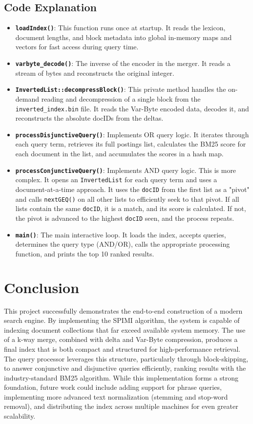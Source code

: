 \documentclass[11pt, a4paper]{report}
\begin{document}
\section{Code Explanation}
\begin{itemize}
    \item \textbf{\texttt{loadIndex()}}: This function runs once at startup. It reads the lexicon, document lengths, and block metadata into global in-memory maps and vectors for fast access during query time.
    \item \textbf{\texttt{varbyte\_decode()}}: The inverse of the encoder in the merger. It reads a stream of bytes and reconstructs the original integer.
    \item \textbf{\lstinline{InvertedList::decompressBlock()}}: This private method handles the on-demand reading and decompression of a single block from the \lstinline{inverted_index.bin} file. It reads the Var-Byte encoded data, decodes it, and reconstructs the absolute docIDs from the deltas.
    \item \textbf{\texttt{processDisjunctiveQuery()}}: Implements OR query logic. It iterates through each query term, retrieves its full postings list, calculates the BM25 score for each document in the list, and accumulates the scores in a hash map.
    \item \textbf{\texttt{processConjunctiveQuery()}}: Implements AND query logic. This is more complex. It opens an \lstinline{InvertedList} for each query term and uses a document-at-a-time approach. It uses the \lstinline{docID} from the first list as a "pivot" and calls \lstinline{nextGEQ()} on all other lists to efficiently seek to that pivot. If all lists contain the same \lstinline{docID}, it is a match, and its score is calculated. If not, the pivot is advanced to the highest \lstinline{docID} seen, and the process repeats.
    \item \textbf{\texttt{main()}}: The main interactive loop. It loads the index, accepts queries, determines the query type (AND/OR), calls the appropriate processing function, and prints the top 10 ranked results.
\end{itemize}

\chapter{Conclusion}
This project successfully demonstrates the end-to-end construction of a modern search engine. By implementing the SPIMI algorithm, the system is capable of indexing document collections that far exceed available system memory. The use of a k-way merge, combined with delta and Var-Byte compression, produces a final index that is both compact and structured for high-performance retrieval. The query processor leverages this structure, particularly through block-skipping, to answer conjunctive and disjunctive queries efficiently, ranking results with the industry-standard BM25 algorithm. While this implementation forms a strong foundation, future work could include adding support for phrase queries, implementing more advanced text normalization (stemming and stop-word removal), and distributing the index across multiple machines for even greater scalability.
\end{document}
